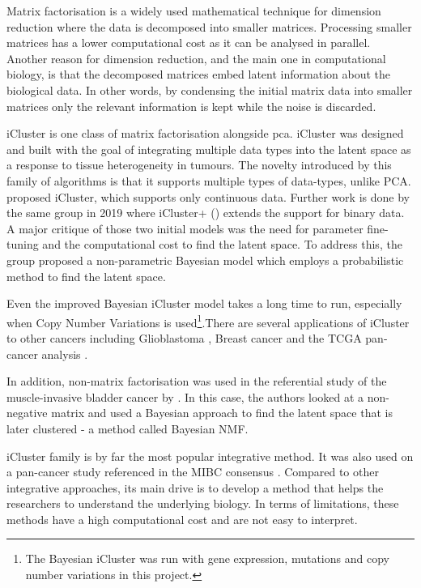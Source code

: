 Matrix factorisation is a widely used mathematical technique for dimension reduction where the data is decomposed into smaller matrices. Processing smaller matrices has a lower computational cost as it can be analysed in parallel. Another reason for dimension reduction, and the main one in computational biology, is that the decomposed matrices embed latent information about the biological data. In other words, by condensing the initial matrix data into smaller matrices only the relevant information is kept while the noise is discarded. 

iCluster \citep{Shen2009-ew, Mo2013-zi, Mo2018-el} is one class of matrix factorisation alongside \acrlong{pca}. iCluster was designed and built with the goal of integrating multiple data types into the latent space as a response to tissue heterogeneity in tumours. The novelty introduced by this family of algorithms is that it supports multiple types of data-types, unlike PCA. \citet{Shen2009-ew} proposed iCluster, which supports only continuous data. Further work is done by the same group in 2019  where iCluster+ (\citet{Mo2013-zi}) extends the support for binary data. A major critique of those two initial models was the need for parameter fine-tuning and the computational cost to find the latent space. To address this, the group proposed a non-parametric Bayesian model \citet{Mo2018-el} which employs a probabilistic method to find the latent space. 

Even the improved Bayesian iCluster model takes a long time to run, especially when Copy Number Variations is used\footnote{The Bayesian iCluster was run with gene expression, mutations and copy number variations in this project.}.There are several applications of iCluster to other cancers including Glioblastoma \citep{Shen2012-yj},  Breast cancer \citep{Curtis2012-ff} and the TCGA pan-cancer analysis \citep{Hoadley2018-qe}.

In addition, non-matrix factorisation was used in the referential study of the muscle-invasive bladder cancer by \citet{Robertson2017-mg}. In this case, the authors looked at a non-negative matrix and used a Bayesian approach to find the latent space that is later clustered - a method called Bayesian NMF.

iCluster family is by far the most popular integrative method. It was also used on a pan-cancer \citep{Hoadley2018-qe} study referenced in the MIBC consensus \citep{Kamoun2020-tj}. Compared to other integrative approaches, its main drive is to develop a method that helps the researchers to understand the underlying biology. In terms of limitations, these methods have a high computational cost and are not easy to interpret.

